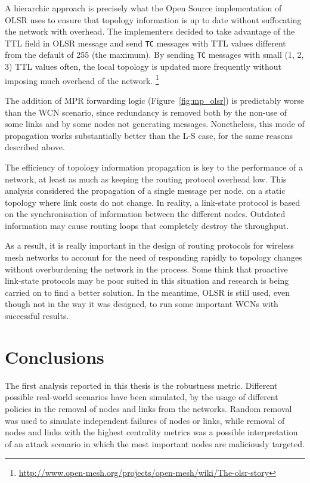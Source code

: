 \documentclass[a4paper,11pt,twoside,openleft]{memoir}
\newcommand{\figref}[1] {Figure~\ref{#1}}
\begin{document}
A hierarchic approach is precisely what the Open Source implementation of OLSR
uses to ensure that topology information is up to date without suffocating
the network with overhead. The implementers decided to take advantage of the
TTL field in OLSR message and send \texttt{TC} messages with TTL values
different from the default of 255 (the maximum). By sending \texttt{TC}
messages with small (1, 2, 3) TTL values often, the local topology is
updated more frequently without imposing much overhead of the network.
\footnote{\url{http://www.open-mesh.org/projects/open-mesh/wiki/The-olsr-story}}

The addition of MPR forwarding logic (\figref{fig:mp_olsr})
is predictably worse than the WCN scenario,
since redundancy is removed both by the non-use of some links and by some nodes
not generating messages.
Nonetheless, this mode of propagation works substantially better than the L-S
case, for the same reasons described above.

The efficiency of topology information propagation is key to the performance of
a network, at least as much as keeping the routing protocol overhead low.
This analysis considered the propagation of a single message per node, on a
static topology where link costs do not change.
In reality, a link-state protocol is based on the synchronisation of information
between the different nodes. Outdated information may cause routing loops that
completely destroy the throughput.

As a result, it is really important in the design of routing protocols for
wireless mesh networks to account for the need of responding rapidly to
topology changes without overburdening the network in the process.
Some think that proactive link-state protocols may be poor suited in this
situation and research is being carried on to find a better solution.
In the meantime, OLSR is still used, even though not in the way it was designed,
to run some important WCNs with successful results.

\chapter{Conclusions}\label{conclusions}

The first analysis reported in this thesis is the robustness metric.
Different possible real-world scenarios have been simulated, by the usage
of different policies in the removal of nodes and links from the networks.
Random removal was used to simulate independent failures of nodes or links,
while removal of nodes and links with the highest centrality metrics was a
possible interpretation of an attack scenario in which the most important
nodes are maliciously targeted.
\end{document}
